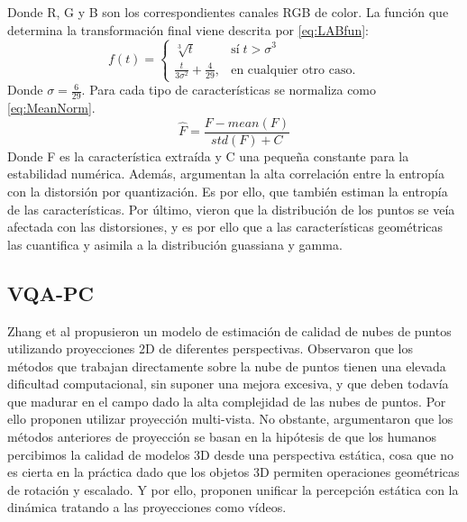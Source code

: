 Donde R, G y B son los correspondientes canales RGB de color. La función que 
determina la transformación final viene descrita por \eqref{eq:LABfun}: 
\begin{equation}
  f(t) = \begin{cases} \sqrt[3]{t} & \textrm{sí}\; t > \sigma^3 \\ 
    \frac{t}{3\sigma^2} + \frac{4}{29},& \textrm{en cualquier otro caso.}
         \end{cases}  
  \label{eq:LABfun}
\end{equation}
Donde $\sigma = \frac{6}{29}$.
Para cada tipo de características se normaliza como \eqref{eq:MeanNorm}.
\begin{equation} 
  \hat F = \frac{F-mean(F)}{std(F) + C}
  \label{eq:MeanNorm}
\end{equation}
Donde F es la característica extraída y C una pequeña constante para la 
estabilidad numérica. Además, argumentan la alta correlación entre la 
entropía con la distorsión por quantización. Es por ello, que también 
estiman la entropía de las características. 
Por último, vieron que la distribución de los puntos se veía afectada con 
las distorsiones, y es por ello que a las características geométricas 
las cuantifica y asimila a la distribución guassiana y gamma. 


\subsection{VQA-PC}
Zhang et al\cite{VQA-PC} propusieron un modelo de estimación de calidad de nubes 
de puntos utilizando proyecciones 2D de diferentes perspectivas. 
Observaron que los métodos que trabajan directamente sobre la nube de puntos tienen
una elevada dificultad computacional, sin suponer una mejora excesiva, y que 
deben todavía que madurar en el campo dado la alta complejidad de las nubes de puntos.
Por ello proponen utilizar proyección multi-vista. No obstante, argumentaron que 
los métodos anteriores de proyección se basan en la hipótesis de que los humanos 
percibimos la calidad de modelos 3D desde una perspectiva estática, cosa que no 
es cierta en la práctica dado que los objetos 3D permiten operaciones geométricas 
de rotación y escalado.
Y por ello, proponen unificar la percepción estática con la dinámica tratando 
a las proyecciones como vídeos.

